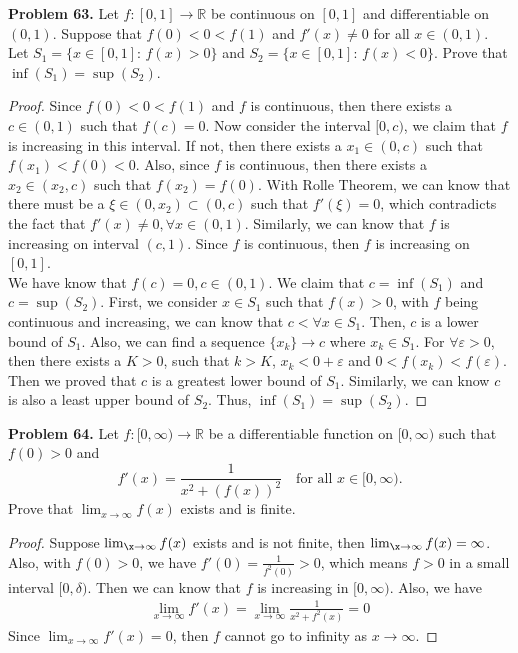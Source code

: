 \documentclass[12pt,leqno]{amsart}
\begin{document}
\medskip



\noindent
{\bf Problem 63.}
Let $f:[0,1]\to\mathbb{R}$ be continuous on $[0,1]$ and differentiable on $(0,1)$. Suppose that $f(0)<0<f(1)$ and $f'(x)\neq 0$ for all $x\in (0,1)$. Let
$S_1=\{x\in [0,1]:\,f(x)>0\}$ and $S_2=\{x\in [0,1]:\,   f(x)<0\}$. Prove that $\inf(S_1)=\sup(S_2)$.
\begin{proof}
Since $f(0)<0<f(1)$ and $f$ is continuous, then there exists a $c\in(0,1)$ such that $f(c)=0$. Now consider the interval $[0,c)$, we claim that $f$ is increasing in this interval. If not, then there exists a $x_1\in(0,c)$ such that $f(x_1)<f(0)<0$. Also, since $f$ is continuous, then there exists a $x_2\in(x_2,c)$ such that $f(x_2)=f(0)$. With Rolle Theorem, we can know that there must be a $\xi\in(0,x_2)\subset (0,c)$ such that $f'(\xi)=0$, which contradicts the fact that $f'(x)\neq 0, \forall x\in(0,1)$. Similarly, we can know that $f$ is increasing on interval $(c,1)$. Since $f$ is continuous, then $f$ is increasing on $[0,1]$. \\
\hspace*{3em}We have know that $f(c)=0, c\in(0,1)$. We claim that $c=\inf (S_1)$ and $c=\sup (S_2)$. First, we consider $x\in S_1$ such that $f(x)>0$, with $f$ being continuous and increasing, we can know that $c<\forall x\in S_1$. Then, $c$ is a lower bound of $S_1$. Also, we can find a sequence $\{x_k\}\rightarrow c$ where $x_k\in S_1$. For $\forall \varepsilon>0$, then there exists a $K>0$, such that $k>K$, $x_k<0+\varepsilon$ and $0<f(x_k)<f(\varepsilon)$. Then we proved that $c$ is a greatest lower bound of $S_1$. Similarly, we can know $c$ is also a least upper bound of $S_2$. Thus, $\inf(S_1)=\sup(S_2)$.
\end{proof}

\medskip


\noindent
{\bf Problem 64.}
Let $f:[0,\infty)\to\mathbb{R}$ be a differentiable function on $[0,\infty)$ such that $f(0)>0$ and
$$
f'(x)=\frac{1}{x^2+(f(x))^2}
\quad
\text{for all $x\in [0,\infty)$.}
$$
Prove that $\lim_{x\to\infty} f(x)$ exists and is finite.
\begin{proof}
Suppose $\lim_{\x\to\infty}f(x)$ exists and is not finite, then $\lim_{\x\to\infty}f(x)=\infty$. Also, with $f(0)>0$, we have $f'(0)=\frac{1}{f^2(0)}>0$, which means $f>0$ in a small interval $[0,\delta)$. Then we can know that $f$ is increasing in $[0,\infty)$. Also, we have 
\begin{align*}
    \lim_{x\to\infty}f'(x)=\lim_{x\to\infty}\frac{1}{x^2+f^2(x)}=0
\end{align*}
Since $\lim_{x\to\infty}f'(x)=0$, then $f$ cannot go to infinity as $x\rightarrow \infty$.
\end{proof}
\end{document}
